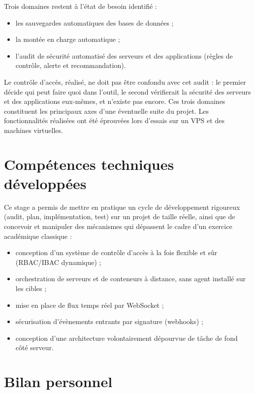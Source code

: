 Trois domaines restent à l'état de besoin identifié :

\begin{itemize}
  \item les sauvegardes automatiques des bases de données ;
  \item la montée en charge automatique ;
  \item l'audit de sécurité automatisé des serveurs et des applications
        (règles de contrôle, alerte et recommandation).
\end{itemize}

Le contrôle d'accès, réalisé, ne doit pas être confondu avec cet audit :
le premier décide qui peut faire quoi dans l'outil, le second
vérifierait la sécurité des serveurs et des applications eux-mêmes, et
n'existe pas encore. Ces trois domaines constituent les principaux axes
d'une éventuelle suite du projet. Les fonctionnalités réalisées ont été
éprouvées lors d'essais sur un VPS et des machines virtuelles.

\section*{Compétences techniques développées}

Ce stage a permis de mettre en pratique un cycle de développement
rigoureux (audit, plan, implémentation, test) sur un projet de taille
réelle, ainsi que de concevoir et manipuler des mécanismes qui dépassent
le cadre d'un exercice académique classique :

\begin{itemize}
  \item conception d'un système de contrôle d'accès à la fois flexible
        et sûr (RBAC/IBAC dynamique) ;
  \item orchestration de serveurs et de conteneurs à distance, sans
        agent installé sur les cibles ;
  \item mise en place de flux temps réel par WebSocket ;
  \item sécurisation d'évènements entrants par signature (webhooks) ;
  \item conception d'une architecture volontairement dépourvue de tâche
        de fond côté serveur.
\end{itemize}

\section*{Bilan personnel}

